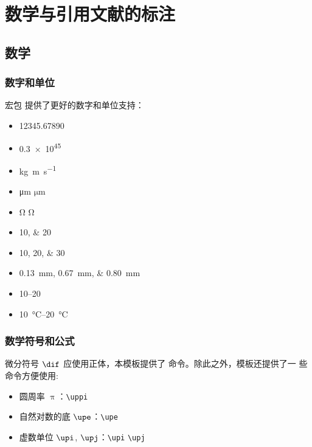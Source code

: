 
\chapter{数学与引用文献的标注}

\section{数学}

\subsection{数字和单位}

宏包  提供了更好的数字和单位支持：
\begin{itemize}
  \item \num{12345.67890}
  \item \num{.3e45}
  \item \si{kg.m.s^{-1}}
  \item \si{\micro\meter} $\si{\micro\meter}$
  \item \si{\ohm} $\si{\ohm}$
  \item \numlist{10;20}
  \item \numlist{10;20;30}
  \item \SIlist{0.13;0.67;0.80}{\milli\metre}
  \item \numrange{10}{20}
  \item \SIrange{10}{20}{\degreeCelsius}
\end{itemize}

\subsection{数学符号和公式}

微分符号 $\dif$ 应使用正体，本模板提供了  命令。除此之外，模板还提供了一
些命令方便使用:
\begin{itemize}
  \item 圆周率 $\uppi$：\verb|\uppi|
  \item 自然对数的底 $\upe$：\verb|\upe|
  \item 虚数单位 $\upi$, $\upj$：\verb|\upi| \verb|\upj|
\end{itemize}

